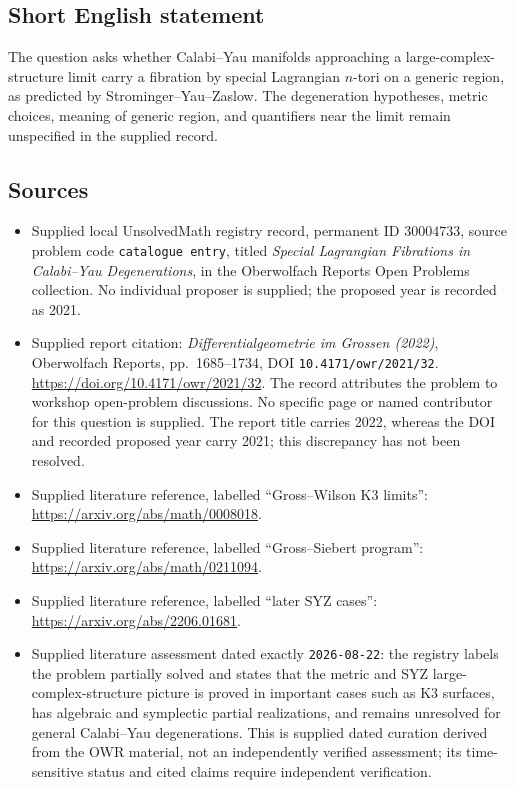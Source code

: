 \documentclass[11pt]{article}
\begin{document}
\subsection{Short English statement}
The question asks whether Calabi--Yau manifolds approaching a large-complex-structure limit carry a fibration by special Lagrangian \(n\)-tori on a generic region, as predicted by Strominger--Yau--Zaslow. The degeneration hypotheses, metric choices, meaning of generic region, and quantifiers near the limit remain unspecified in the supplied record.
\subsection{Sources}
\begin{itemize}
\item Supplied local UnsolvedMath registry record, permanent ID \(30004733\), source problem code \texttt{catalogue entry}, titled \emph{Special Lagrangian Fibrations in Calabi--Yau Degenerations}, in the Oberwolfach Reports Open Problems collection. No individual proposer is supplied; the proposed year is recorded as 2021.
\item Supplied report citation: \emph{Differentialgeometrie im Grossen (2022)}, Oberwolfach Reports, pp.~1685--1734, DOI \texttt{10.4171/owr/2021/32}. \url{https://doi.org/10.4171/owr/2021/32}. The record attributes the problem to workshop open-problem discussions. No specific page or named contributor for this question is supplied. The report title carries 2022, whereas the DOI and recorded proposed year carry 2021; this discrepancy has not been resolved.
\item Supplied literature reference, labelled ``Gross--Wilson K3 limits'': \url{https://arxiv.org/abs/math/0008018}.
\item Supplied literature reference, labelled ``Gross--Siebert program'': \url{https://arxiv.org/abs/math/0211094}.
\item Supplied literature reference, labelled ``later SYZ cases'': \url{https://arxiv.org/abs/2206.01681}.
\item Supplied literature assessment dated exactly \texttt{2026-08-22}: the registry labels the problem partially solved and states that the metric and SYZ large-complex-structure picture is proved in important cases such as K3 surfaces, has algebraic and symplectic partial realizations, and remains unresolved for general Calabi--Yau degenerations. This is supplied dated curation derived from the OWR material, not an independently verified assessment; its time-sensitive status and cited claims require independent verification.
\end{itemize}
\end{document}
